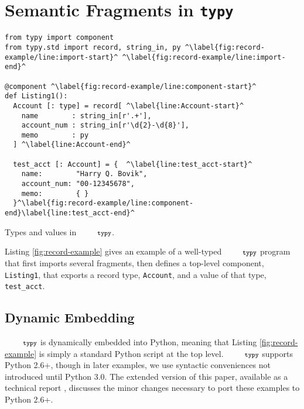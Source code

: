 \documentclass[10pt]{sigplanconf}
\newcommand{\typy}{\texttt{\footnotesize typy}}
\newcommand{\lip}[1]{\lstinline[language=Python,basicstyle=\ttfamily\footnotesize,morekeywords={with},deletendkeywords={tuple,buffer,map}]{#1}}
\begin{document}
\section{Semantic Fragments in \texttt{typy}}\label{sec:typy-by-example}
\begin{codelisting}[t]
\vspace{-3px}
\begin{lstlisting}
from typy import component
from typy.std import record, string_in, py ^\label{fig:record-example/line:import-start}^ ^\label{fig:record-example/line:import-end}^

@component ^\label{fig:record-example/line:component-start}^
def Listing1():
  Account [: type] = record[ ^\label{line:Account-start}^
    name        : string_in[r'.+'],
    account_num : string_in[r'\d{2}-\d{8}'],
    memo        : py
  ] ^\label{line:Account-end}^

  test_acct [: Account] = {  ^\label{line:test_acct-start}^
    name:        "Harry Q. Bovik",
    account_num: "00-12345678",
    memo:        { }
  }^\label{fig:record-example/line:component-end}\label{line:test_acct-end}^
\end{lstlisting}
\caption{Types and values in $\typy $.}
\label{fig:record-example}
\end{codelisting}

Listing \ref{fig:record-example} gives an example of a well-typed $\typy$ program that first imports several fragments, then defines a top-level {component}, \lip{Listing1}, that exports a record type, \lip{Account}, and a value of that type, \lip{test_acct}. 

\subsection{Dynamic Embedding} 
$\typy$ is dynamically embedded into Python, meaning that Listing \ref{fig:record-example} is simply a standard Python script at the top level. $\typy$ supports Python 2.6+, though in later examples, we use syntactic conveniences not introduced until Python 3.0. The extended version of this paper, available as a technical report \cite{gpce16tr}, discusses the minor changes necessary to port these examples to Python 2.6+.%
\end{document}
